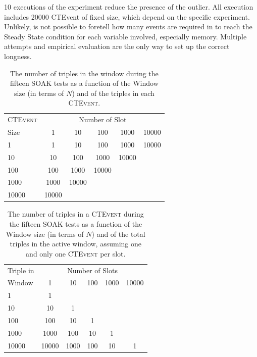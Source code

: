 10 executions of the experiment reduce the presence of the outlier. All execution includes 20000 CTEvent of fixed size, which depend on the specific experiment. Unlikely, is not possible to foretell how many events are required in to reach the Steady State condition for each variable involved, especially memory. Multiple attempts and empirical evaluation are the only way to set up the correct longness.

\begin{table}[htb]
\centering
 \begin{tabular}{l| ccccc}
	  	\hline
		\textsc{CTEvent}  &\multicolumn{5}{c}{Number of Slot}  \\
		Size  & 1 & 10 & 100 & 1000&10000 \\
		\hline	
		1 & 1& 10 & 100 & 1000&10000 \\
		10  & 10 & 100 & 1000&10000 \\
		100 & 100&1000&10000  \\
		1000 &1000 & 10000 \\
		10000&10000  \\
		\hline 
	\end{tabular}
	
	 \vspace{10pt}
	\caption{The number of triples in the window during the fifteen SOAK tests as a function of the Window size (in terms of $N$) and of the triples in each \textsc{CTEvent}.}
	\label{tab:soaktests}
\end{table}


\begin{table}[htb]
	\centering
	\begin{tabular}{l | ccccc} %
	  	\hline
		Triple in & \multicolumn{5}{c}{Number of Slots}  \\
		Window  & 1 & 10 & 100 & 1000&10000\\
		\hline
		1  	 & 1\\
		10   & 10  & 1 \\
		100  & 100 & 10 & 1\\
		1000 & 1000& 100& 10& 1\\
		10000& 10000 & 1000& 100& 10& 1\\
		\hline %
	 \end{tabular}
	\caption{The number of triples in a \textsc{CTEvent} during the fifteen SOAK tests as a function of the Window size (in terms of $N$) and of the total triples in the active window, assuming one and only one \textsc{CTEvent} per slot.}
	\label{tab:soaktests-alt}
\end{table}


